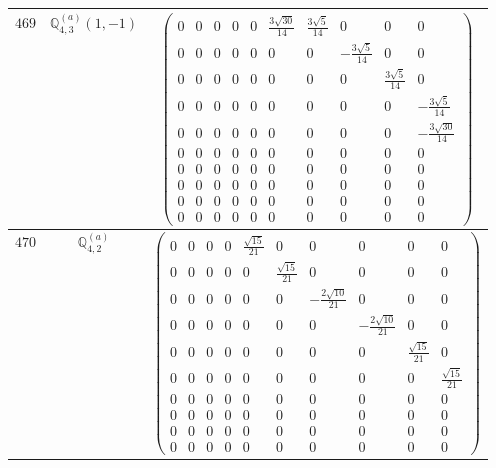 \documentclass[fleqn,8pt,landscape]{jsarticle}
\begin{document}
\begin{center}
\begin{longtable}{ccc}
$ 469 $ & $ \mathbb{Q}_{4,3}^{(a)}(1,-1) $ & $ \begin{pmatrix} 0 & 0 & 0 & 0 & 0 & \frac{3 \sqrt{30}}{14} & \frac{3 \sqrt{5}}{14} & 0 & 0 & 0 \\ 0 & 0 & 0 & 0 & 0 & 0 & 0 & - \frac{3 \sqrt{5}}{14} & 0 & 0 \\ 0 & 0 & 0 & 0 & 0 & 0 & 0 & 0 & \frac{3 \sqrt{5}}{14} & 0 \\ 0 & 0 & 0 & 0 & 0 & 0 & 0 & 0 & 0 & - \frac{3 \sqrt{5}}{14} \\ 0 & 0 & 0 & 0 & 0 & 0 & 0 & 0 & 0 & - \frac{3 \sqrt{30}}{14} \\ 0 & 0 & 0 & 0 & 0 & 0 & 0 & 0 & 0 & 0 \\ 0 & 0 & 0 & 0 & 0 & 0 & 0 & 0 & 0 & 0 \\ 0 & 0 & 0 & 0 & 0 & 0 & 0 & 0 & 0 & 0 \\ 0 & 0 & 0 & 0 & 0 & 0 & 0 & 0 & 0 & 0 \\ 0 & 0 & 0 & 0 & 0 & 0 & 0 & 0 & 0 & 0 \end{pmatrix} $ \\ \hline
$ 470 $ & $ \mathbb{Q}_{4,2}^{(a)} $ & $ \begin{pmatrix} 0 & 0 & 0 & 0 & \frac{\sqrt{15}}{21} & 0 & 0 & 0 & 0 & 0 \\ 0 & 0 & 0 & 0 & 0 & \frac{\sqrt{15}}{21} & 0 & 0 & 0 & 0 \\ 0 & 0 & 0 & 0 & 0 & 0 & - \frac{2 \sqrt{10}}{21} & 0 & 0 & 0 \\ 0 & 0 & 0 & 0 & 0 & 0 & 0 & - \frac{2 \sqrt{10}}{21} & 0 & 0 \\ 0 & 0 & 0 & 0 & 0 & 0 & 0 & 0 & \frac{\sqrt{15}}{21} & 0 \\ 0 & 0 & 0 & 0 & 0 & 0 & 0 & 0 & 0 & \frac{\sqrt{15}}{21} \\ 0 & 0 & 0 & 0 & 0 & 0 & 0 & 0 & 0 & 0 \\ 0 & 0 & 0 & 0 & 0 & 0 & 0 & 0 & 0 & 0 \\ 0 & 0 & 0 & 0 & 0 & 0 & 0 & 0 & 0 & 0 \\ 0 & 0 & 0 & 0 & 0 & 0 & 0 & 0 & 0 & 0 \end{pmatrix} $ \\ \hline

\end{longtable}
\end{center}
\end{document}

